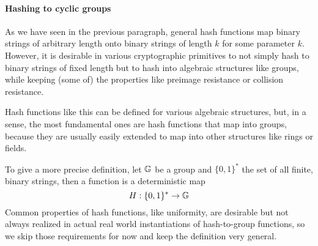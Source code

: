 \paragraph{Hashing to cyclic groups} As we have seen in the previous paragraph, general hash functions map binary strings of arbitrary length onto binary strings of length $k$ for some parameter $k$. However, it is desirable in various cryptographic primitives to not simply hash to binary strings of fixed length but to hash into algebraic structures like groups, while keeping (some of) the properties like preimage resistance or collision resistance. 

Hash functions like this can be defined for various algebraic structures, but, in a sense, the most fundamental ones are hash functions that map into groups, because they are usually easily extended to map into other structures like rings or fields. 

To give a more precise definition, let $\mathbb{G}$ be a group and $\{0,1\}^*$ the set of all finite, binary strings, then a  function is a deterministic map
\begin{equation}
H : \{0,1\}^* \to \mathbb{G}
\end{equation}
Common properties of hash functions, like uniformity, are desirable but not always realized in actual real world instantiations of hash-to-group functions, so we skip those requirements for now and keep the definition very general.


